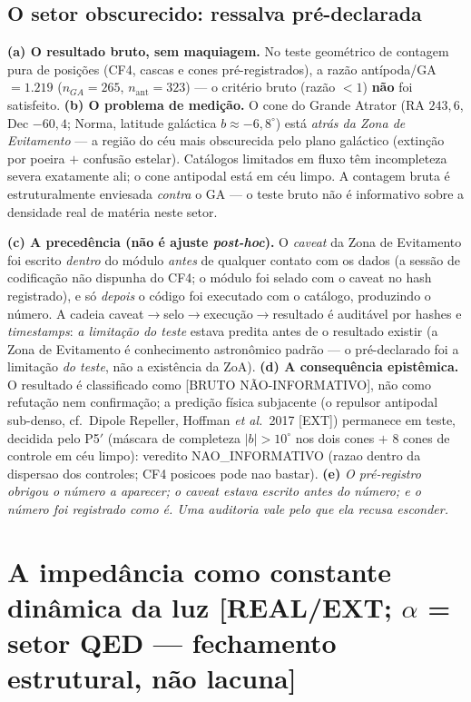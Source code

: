 \documentclass[11pt]{article}
\theoremstyle{definition}\newtheorem{deriv}{Derivação}
\begin{document}
\subsection*{O setor obscurecido: ressalva pré-declarada}

\textbf{(a) O resultado bruto, sem maquiagem.} No teste geométrico de contagem pura de posições (CF4, cascas e cones pré-registrados), a razão antípoda/GA $=1.219$ ($n_{GA}=265$, $n_{\mathrm{ant}}=323$) --- o critério bruto (razão $<1$) \textbf{não} foi satisfeito. \textbf{(b) O problema de medição.} O cone do Grande Atrator (RA $243{,}6$, Dec $-60{,}4$; Norma, latitude galáctica $b\approx-6{,}8^\circ$) está \emph{atrás da Zona de Evitamento} --- a região do céu mais obscurecida pelo plano galáctico (extinção por poeira $+$ confusão estelar). Catálogos limitados em fluxo têm incompleteza severa exatamente ali; o cone antipodal está em céu limpo. A contagem bruta é estruturalmente enviesada \emph{contra} o GA --- o teste bruto não é informativo sobre a densidade real de matéria neste setor.

\textbf{(c) A precedência (não é ajuste \emph{post-hoc}).} O \emph{caveat} da Zona de Evitamento foi escrito \emph{dentro} do módulo \emph{antes} de qualquer contato com os dados (a sessão de codificação não dispunha do CF4; o módulo foi selado com o caveat no hash registrado), e só \emph{depois} o código foi executado com o catálogo, produzindo o número. A cadeia caveat$\to$selo$\to$execução$\to$resultado é auditável por hashes e \emph{timestamps}: \emph{a limitação do teste} estava predita antes de o resultado existir (a Zona de Evitamento é conhecimento astronômico padrão --- o pré-declarado foi a limitação \emph{do teste}, não a existência da ZoA). \textbf{(d) A consequência epistêmica.} O resultado é classificado como \textsf{[BRUTO NÃO-INFORMATIVO]}, não como refutação nem confirmação; a predição física subjacente (o repulsor antipodal sub-denso, cf.\ Dipole Repeller, Hoffman \emph{et al.}\ 2017 [EXT]) permanece em teste, decidida pelo P5$'$ (máscara de completeza $|b|>10^\circ$ nos dois cones $+$ 8 cones de controle em céu limpo): veredito \textsf{NAO\_INFORMATIVO (razao dentro da dispersao dos controles; CF4 posicoes pode nao bastar)}. \textbf{(e)} \emph{O pré-registro obrigou o número a aparecer; o caveat estava escrito antes do número; e o número foi registrado como é. Uma auditoria vale pelo que ela recusa esconder.}

\section{A impedância como constante dinâmica da luz \textsf{[REAL/EXT; $\alpha$ = setor QED --- fechamento estrutural, não lacuna]}}
\end{document}
